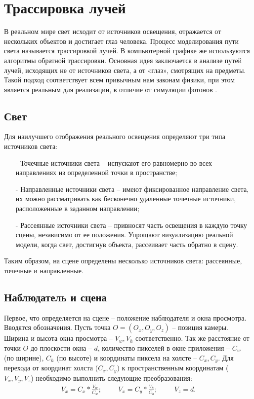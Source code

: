\section{Трассировка лучей}

В реальном мире свет исходит от источников освещения, отражается от нескольких объектов и достигает глаз человека. Процесс моделирования пути света называется трассировкой лучей. В компьютерной графике же используются алгоритмы обратной трассировки. Основная идея заключается в анализе путей лучей, исходящих не от источников света, а от «глаз», смотрящих на предметы. Такой подход соответствует всем привычным нам законам физики, при этом является реальным для реализации, в отличие от симуляции фотонов \cite{b4}.

\subsection{Свет}

Для наилучшего отображения реального освещения определяют три типа источников света:
\begin{itemize}[label=\arabic*)]
	\item[-] Точечные источники света -- испускают его равномерно во всех направлениях из определенной точки в пространстве;
	\item[-] Направленные источники света -- имеют фиксированное направление света, их можно рассматривать как бесконечно удаленные точечные источники, расположенные в заданном направлении;
	\item[-] Рассеянные источники света -- привносят часть освещения в каждую точку сцены, независимо от ее положения. Упрощают визуализацию реальной модели, когда свет, достигнув объекта, рассеивает часть обратно в сцену.
\end{itemize}

Таким образом, на сцене определены несколько источников света: рассеянные, точечные и направленные.

\subsection{Наблюдатель и сцена}

Первое, что определяется на сцене -- положение наблюдателя и окна просмотра. Вводятся обозначения. Пусть точка $O = (O_{x}, O_{y}, O_{z})$ -- позиция камеры. Ширина и высота окна просмотра -- $V_{w}, V_{h}$ соответственно. Так же расстояние от точки $O$ до плоскости окна -- $d$, количество пикселей в окне приложения -- $C_{w}$ (по ширине), $C_{h}$ (по высоте) и координаты пиксела на холсте -- $C_{x}, C_{y}$.
Для перехода от координат холста ($C_{x}, C_{y}$) к пространственным координатам ($V_{x}, V_{y}, V_{z}$) необходимо выполнить следующие преобразования:
\begin{gather}
	V_{x} = C_{x}*\frac{V_{w}}{C_{w}};\hspace{1cm}V_{x} = C_{y}*\frac{V_{h}}{C_{h}};\hspace{1cm}V_{z} = d.
\end{gather}

